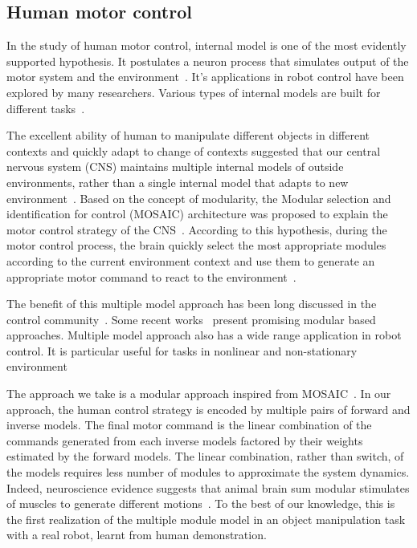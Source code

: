 
\subsection{Human motor control}

In the study of human motor control, internal model is one of the most evidently supported hypothesis. It postulates a neuron process that simulates output of the motor system and the environment~\cite{kawato1999internal}. It's applications in robot control have been explored by many researchers. Various types of internal models are built for different tasks~\cite{sciavicco2000modelling,jordan1992forward}.

The excellent ability of human to manipulate different objects in different contexts and quickly adapt to change of contexts suggested that our central nervous system (CNS) maintains multiple internal models of outside environments, rather than a single internal model that adapts to new environment~\cite{neilson1985acquisition}. Based on the concept of modularity, the Modular selection and identification for control (MOSAIC) architecture was proposed to explain the motor control strategy of the CNS~\cite{wolpert1998multiple}. According to this hypothesis, during the motor control process, the brain quickly select the most appropriate modules according to the current environment context and use them to generate an appropriate motor command to react to the environment~\cite{haruno2001mosaic}.

The benefit of this multiple model approach has been long discussed in the control community~\cite{jacobs1991adaptive,narendra1995adaptation,narendra1997adaptive}. Some recent works~\cite{fekri2007robust,kuipers2010multiple} present promising modular based approaches. Multiple model approach also has a wide range application in robot control. It is particular useful for tasks in nonlinear and non-stationary environment~\cite{petkos2006learning,sugimoto2012emosaic}



The approach we take is a modular approach inspired from MOSAIC~\cite{haruno2001mosaic}. In our approach, the human control strategy is encoded by multiple pairs of forward and inverse models. The final motor command is the linear combination of the commands generated from each inverse models factored by their weights estimated by the forward models. The linear combination, rather than switch, of the models requires less number of modules to approximate the system dynamics. Indeed, neuroscience evidence suggests that animal brain sum modular stimulates of muscles to generate different motions~\cite{mussa1994linear}. To the best of our knowledge, this is the first realization of the multiple module model in an object manipulation task with a real robot, learnt from human demonstration.

